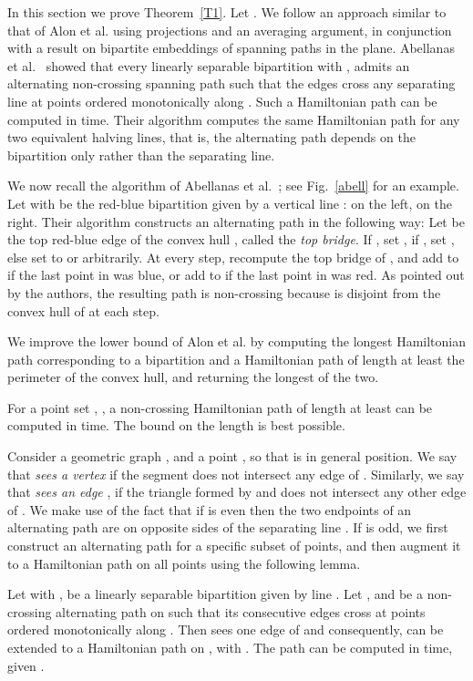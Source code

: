 \documentclass[proceedings]{stacs}
\begin{document}
In this section we prove Theorem~\ref{T1}. Let .
We follow an approach similar to that of Alon et al. using projections and
an averaging argument, in conjunction with a result on bipartite
embeddings of spanning paths in the plane. Abellanas et
al.~\cite[Theorem~3.1]{AGH+99} showed that every linearly separable bipartition
 with , admits an alternating non-crossing
spanning path such that the edges cross any separating line  at points
ordered monotonically along . Such a Hamiltonian path can be computed
in  time. Their algorithm computes the same Hamiltonian path for
any two equivalent halving lines, that is, the alternating path depends on the
bipartition only rather than the separating line.

We now recall the algorithm of Abellanas et al.~\cite{AGH+99};
see Fig.~\ref{abell} for an example.
Let  with  be the red-blue bipartition
given by a vertical line :  on the left,  on the right.
Their algorithm constructs an alternating path  in the following way:
Let  be the top red-blue edge of
the convex hull , called the {\em top bridge}. If ,
set , if , set , else
set  to  or  arbitrarily. At every step, recompute
the top bridge  of , and add  to 
if the last point in  was blue, or add  to 
if the last point in  was red.  As pointed out by the authors, the
resulting path  is non-crossing because  is disjoint from the
convex hull of  at each step.

We improve the lower bound of Alon et al. by computing the longest
Hamiltonian path corresponding to a bipartition and a Hamiltonian path of
length at least the perimeter of the convex hull, and returning the
longest of the two.
\begin{lemma} \label{L1}
For a point set , , a non-crossing Hamiltonian
path of length at least  can be computed in 
time. The bound on the length is best possible.
\end{lemma}


Consider a geometric graph , and a point ,
so that  is in general position.
We say that  {\em sees a vertex}  if the segment   does not intersect any
edge of . Similarly, we say that  {\em sees an edge} ,
if the triangle formed by  and  does not intersect any other edge of
.
We make use of the fact that if  is even then the two endpoints of an
alternating path are on opposite sides of the separating line .
If  is odd, we first construct an alternating path for a specific subset of
 points, and then augment it to a Hamiltonian path on all  points using
the following lemma.

\begin{lemma} \label{L2}
Let  with , be a linearly separable bipartition
given by line . Let , and  be a non-crossing alternating
path on  such that its consecutive edges cross  at
points ordered monotonically along . Then  sees one edge of
 and consequently,  can be extended to a Hamiltonian path  on , with
. The path  can be computed in  time, given .
\end{lemma}
\end{document}
